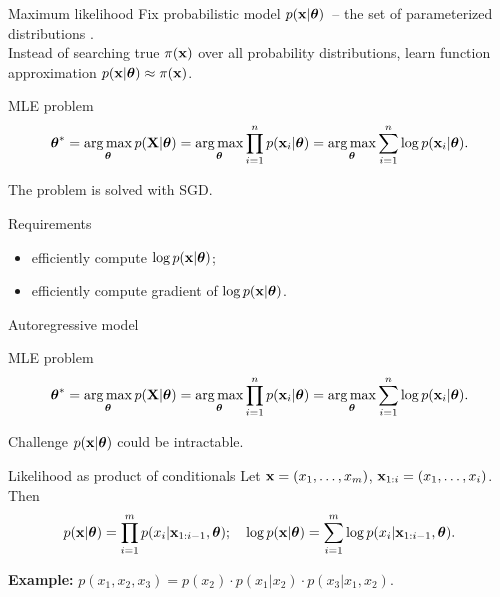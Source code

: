 \begin{frame}{Maximum likelihood}
    Fix probabilistic model $p(\mathbf{x} | \boldsymbol{\theta})$~-- the set of parameterized distributions . \\
    Instead of searching true $\pi(\mathbf{x})$ over all probability distributions, learn function approximation $p(\mathbf{x} | \boldsymbol{\theta}) \approx \pi(\mathbf{x})$.
    
    \begin{block}{MLE problem}
    \vspace{-0.3cm}
    \[
        \boldsymbol{\theta}^* = \operatorname*{arg\,max}_{\boldsymbol{\theta}} p(\mathbf{X} | \boldsymbol{\theta}) = \operatorname*{arg\,max}_{\boldsymbol{\theta}} \prod_{i=1}^n p(\mathbf{x}_i | \boldsymbol{\theta}) = \operatorname*{arg\,max}_{\boldsymbol{\theta}} \sum_{i=1}^n \log p(\mathbf{x}_i | \boldsymbol{\theta}).
    \]
    \vspace{-0.1cm}
    \end{block}
    
    The problem is solved with SGD.
    \begin{block}{Requirements}
        \begin{itemize}
            \item efficiently compute $\log p(\mathbf{x} | \boldsymbol{\theta})$;
            \item efficiently compute gradient of $\log p(\mathbf{x} | \boldsymbol{\theta})$.
        \end{itemize}
    \end{block}
\end{frame}
\begin{frame}{Autoregressive model}
    \begin{block}{MLE problem}
    \vspace{-0.5cm}
    \[
        \boldsymbol{\theta}^* = \operatorname*{arg\,max}_{\boldsymbol{\theta}} p(\mathbf{X} | \boldsymbol{\theta}) = \operatorname*{arg\,max}_{\boldsymbol{\theta}} \prod_{i=1}^n p(\mathbf{x}_i | \boldsymbol{\theta}) = \operatorname*{arg\,max}_{\boldsymbol{\theta}} \sum_{i=1}^n \log p(\mathbf{x}_i | \boldsymbol{\theta}).
    \]
    \vspace{-0.5cm}
    \end{block}
    \begin{block}{Challenge}
    $p(\mathbf{x} | \boldsymbol{\theta})$ could be intractable.
    \end{block}
    \begin{block}{Likelihood as product of conditionals}
    Let $\mathbf{x} = (x_1, \dots, x_m)$, $\mathbf{x}_{1:i} = (x_1, \dots, x_i)$. Then 
    \[
        p(\mathbf{x} | \boldsymbol{\theta}) = \prod_{i=1}^m p(x_i | \mathbf{x}_{1:i - 1}, \boldsymbol{\theta}); \quad 
        \log p(\mathbf{x} | \boldsymbol{\theta}) = \sum_{i=1}^m \log p(x_i | \mathbf{x}_{1:i - 1}, \boldsymbol{\theta}).
    \]
    \end{block}
	\textbf{Example:} $p(x_1, x_2, x_3) = p(x_2) \cdot p(x_1 | x_2) \cdot p(x_3 | x_1, x_2)$.
\end{frame}
